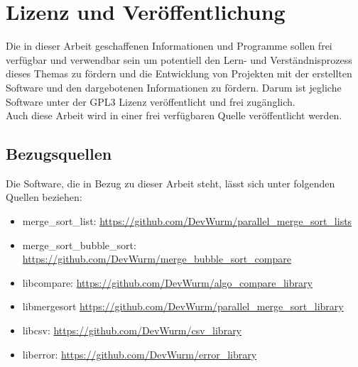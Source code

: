 \chapter{Lizenz und Veröffentlichung}
Die in dieser Arbeit geschaffenen Informationen und Programme sollen frei verfügbar und verwendbar sein um potentiell den Lern- und Verständnisprozess dieses Themas zu fördern und die Entwicklung von Projekten mit der erstellten Software und den dargebotenen Informationen zu fördern. Darum ist jegliche Software unter der GPL3 Lizenz veröffentlicht und frei zugänglich.\\
Auch diese Arbeit wird in einer frei verfügbaren Quelle veröffentlicht werden.
\section{Bezugsquellen}
Die Software, die in Bezug zu dieser Arbeit steht, lässt sich unter folgenden Quellen beziehen:
\begin{itemize}
\item merge\_sort\_list: \url{https://github.com/DevWurm/parallel_merge_sort_lists}
\item merge\_sort\_bubble\_sort: \url{https://github.com/DevWurm/merge_bubble_sort_compare}
\item libcompare: \url{https://github.com/DevWurm/algo_compare_library}
\item libmergesort \url{https://github.com/DevWurm/parallel_merge_sort_library}
\item libcsv: \url{https://github.com/DevWurm/csv_library}
\item liberror: \url{https://github.com/DevWurm/error_library}
\end{itemize}